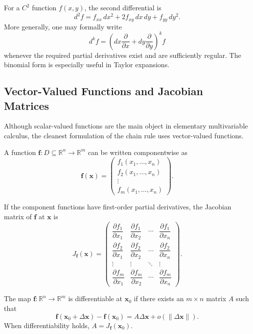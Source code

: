 For a $C^2$ function $f(x,y)$, the second differential is
\[
    d^2f=f_{xx}\,dx^2+2f_{xy}\,dx\,dy+f_{yy}\,dy^2.
\]
More generally, one may formally write
\[
    d^k f=\left(dx\frac{\partial}{\partial x}+dy\frac{\partial}{\partial y}\right)^k f
\]
whenever the required partial derivatives exist and are sufficiently regular. The binomial form is especially useful in Taylor expansions.

\subsection{Vector-Valued Functions and Jacobian Matrices}

Although scalar-valued functions are the main object in elementary multivariable calculus, the cleanest formulation of the chain rule uses vector-valued functions.

\begin{definition}
A function $\mathbf{f}:D\subseteq\mathbb{R}^n\to\mathbb{R}^m$ can be written componentwise as
\[
    \mathbf{f}(\mathbf{x})=
    \begin{pmatrix}
    f_1(x_1,\dots,x_n)\\
    f_2(x_1,\dots,x_n)\\
    \vdots\\
    f_m(x_1,\dots,x_n)
    \end{pmatrix}.
\]
\end{definition}

\begin{definition}
If the component functions have first-order partial derivatives, the Jacobian matrix of $\mathbf{f}$ at $\mathbf{x}$ is
\[
    J_{\mathbf{f}}(\mathbf{x})=
    \begin{pmatrix}
    \dfrac{\partial f_1}{\partial x_1} & \dfrac{\partial f_1}{\partial x_2} & \cdots & \dfrac{\partial f_1}{\partial x_n}\\[6pt]
    \dfrac{\partial f_2}{\partial x_1} & \dfrac{\partial f_2}{\partial x_2} & \cdots & \dfrac{\partial f_2}{\partial x_n}\\
    \vdots & \vdots & \ddots & \vdots\\
    \dfrac{\partial f_m}{\partial x_1} & \dfrac{\partial f_m}{\partial x_2} & \cdots & \dfrac{\partial f_m}{\partial x_n}
    \end{pmatrix}.
\]
\end{definition}

\begin{definition}
The map $\mathbf{f}:\mathbb{R}^n\to\mathbb{R}^m$ is differentiable at $\mathbf{x}_0$ if there exists an $m\times n$ matrix $A$ such that
\[
    \mathbf{f}(\mathbf{x}_0+\Delta\mathbf{x})-\mathbf{f}(\mathbf{x}_0)
    =A\Delta\mathbf{x}+o(\|\Delta\mathbf{x}\|).
\]
When differentiability holds, $A=J_{\mathbf{f}}(\mathbf{x}_0)$.
\end{definition}

